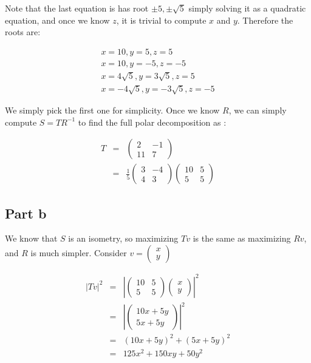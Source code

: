 Note that the last equation is has root $ \pm 5, \pm \sqrt{5} $ simply solving it as a quadratic equation, and once we know $ z $, it is trivial to compute $ x $ and $ y $. Therefore the roots are:

\begin{eqnarray*}
  x = 10, y = 5, z = 5 \\
  x = 10, y = -5, z = -5 \\
  x = 4\sqrt{5}, y = 3\sqrt{5}, z = 5 \\
  x = -4\sqrt{5}, y = -3\sqrt{5}, z = -5
\end{eqnarray*}

We simply pick the first one for simplicity. Once we know $ R $, we can simply compute $ S = TR^{-1} $ to find the full polar decomposition as :

\begin{eqnarray*}
  T &=& \left(\begin{array}{cc} 2 & -1 \\ 11 & 7 \end{array}\right) \\
    &=& \frac{1}{5}\left(\begin{array}{cc}3 & -4 \\ 4 & 3\end{array}\right)\left(\begin{array}{cc} 10 & 5 \\ 5 & 5 \end{array}\right)
\end{eqnarray*}

\subsection*{Part b}
We know that $ S $ is an isometry, so maximizing $ Tv $ is the same as maximizing $ Rv $, and $ R $ is much simpler. Consider $ v = \left(\begin{array}{c} x \\ y \end{array}\right)$

\begin{eqnarray*}
  |Tv|^2 &=& \left|\left(\begin{array}{cc} 10 & 5 \\ 5 & 5 \end{array}\right)\left(\begin{array}{c} x \\ y \end{array}\right)\right|^2 \\
       &=& \left|\left(\begin{array}{c} 10x + 5y \\ 5x + 5y \end{array}\right)\right|^2 \\
       &=& (10x + 5y)^2 + (5x + 5y)^2 \\
       &=& 125x^2 + 150xy + 50y^2 \\
\end{eqnarray*}

